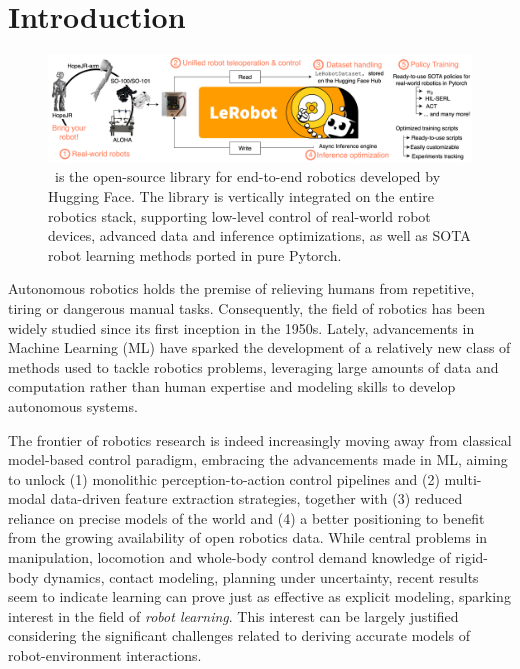 \section{Introduction}

\begin{figure}
    \centering
    \includegraphics[width=\linewidth]{figures/ch1/ch1-lerobot-figure1.png}
    \caption{\lerobot \ is the open-source library for end-to-end robotics developed by Hugging Face. The library is vertically integrated on the entire robotics stack, supporting low-level control of real-world robot devices, advanced data and inference optimizations, as well as  SOTA robot learning methods ported in pure Pytorch.}
    \label{fig:figure1}
\end{figure}

Autonomous robotics holds the premise of relieving humans from repetitive, tiring or dangerous manual tasks.
Consequently, the field of robotics has been widely studied since its first inception in the 1950s.
Lately, advancements in Machine Learning (ML) have sparked the development of a relatively new class of methods used to tackle robotics problems, leveraging large amounts of data and computation rather than human expertise and modeling skills to develop autonomous systems.

The frontier of robotics research is indeed increasingly moving away from classical model-based control paradigm, embracing the advancements made in ML, aiming to unlock (1) monolithic perception-to-action control pipelines and (2) multi-modal data-driven feature extraction strategies, together with (3) reduced reliance on precise models of the world and (4) a better positioning to benefit from the growing availability of open robotics data.
While central problems in manipulation, locomotion and whole-body control demand knowledge of rigid-body dynamics, contact modeling, planning under uncertainty, recent results seem to indicate learning can prove just as effective as explicit modeling, sparking interest in the field of \emph{robot learning}.
This interest can be largely justified considering the significant challenges related to deriving accurate models of robot-environment interactions.

